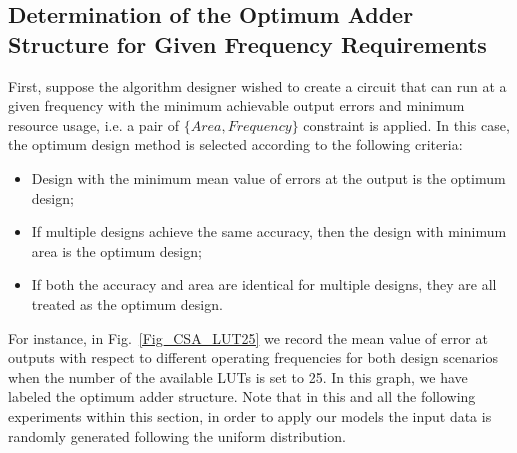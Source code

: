 \documentclass[journal]{IEEEtran}
\begin{document}

\subsection{Determination of the Optimum Adder Structure for Given Frequency Requirements}
First, suppose the algorithm designer wished to create a circuit that can run at a given frequency with the minimum achievable output errors and minimum resource usage, i.e. a pair of $\{Area, Frequency\}$ constraint is applied. In this case, the optimum design method is selected according to the following criteria:
\begin{itemize}
  \item Design with the minimum mean value of errors at the output is the optimum design;
  \item If multiple designs achieve the same accuracy, then the design with minimum area is the optimum design;
  \item If both the accuracy and area are identical for multiple designs, they are all treated as the optimum design.
\end{itemize}

For instance, in Fig.~\ref{Fig_CSA_LUT25} we record the mean value of error at outputs with respect to different operating frequencies for both design scenarios when the number of the available LUTs is set to 25. In this graph, we have labeled the optimum adder structure. Note that in this and all the following experiments within this section, in order to apply our models the input data is randomly generated following the uniform distribution.
\end{document}
